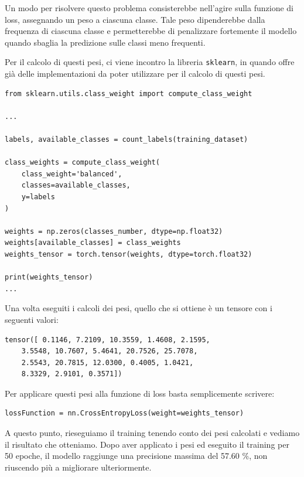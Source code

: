 Un modo per risolvere questo problema consisterebbe nell'agire sulla 
funzione di loss, assegnando un peso a ciascuna classe.
Tale peso dipenderebbe dalla frequenza di ciascuna classe e permetterebbe 
di penalizzare fortemente il modello quando sbaglia la predizione 
sulle classi meno frequenti. 

Per il calcolo di questi pesi, ci viene incontro la libreria 
\texttt{sklearn}, in quando offre già delle implementazioni 
da poter utilizzare per il calcolo di questi pesi.

\begin{lstlisting}
from sklearn.utils.class_weight import compute_class_weight 

...

labels, available_classes = count_labels(training_dataset)

class_weights = compute_class_weight(
    class_weight='balanced',
    classes=available_classes,  
    y=labels
)
        
weights = np.zeros(classes_number, dtype=np.float32)
weights[available_classes] = class_weights
weights_tensor = torch.tensor(weights, dtype=torch.float32)

print(weights_tensor)
...

\end{lstlisting}

Una volta eseguiti i calcoli dei pesi, quello che si ottiene è un 
tensore con i seguenti valori:

\begin{lstlisting}
tensor([ 0.1146, 7.2109, 10.3559, 1.4608, 2.1595,  
    3.5548, 10.7607, 5.4641, 20.7526, 25.7078, 
    2.5543, 20.7815, 12.0300, 0.4005, 1.0421, 
    8.3329, 2.9101, 0.3571])
\end{lstlisting}



Per applicare questi pesi alla funzione di loss basta semplicemente 
scrivere: 
\begin{lstlisting}
lossFunction = nn.CrossEntropyLoss(weight=weights_tensor)
\end{lstlisting}
A questo punto, rieseguiamo il training tenendo conto dei pesi calcolati e vediamo il 
risultato che otteniamo.
\newpage
Dopo aver applicato i pesi ed eseguito il training per 50 epoche, il modello 
raggiunge una precisione massima del 57.60 \%, non riuscendo più a migliorare 
ulteriormente. 

